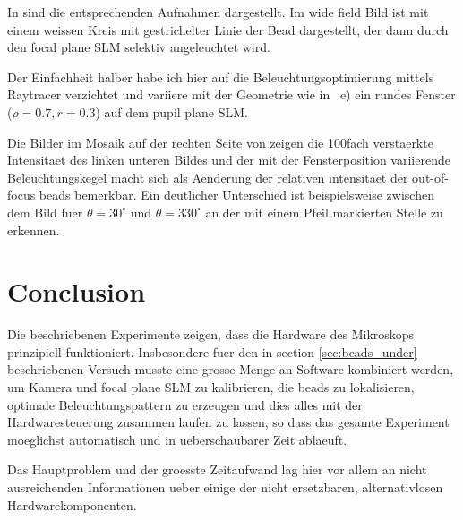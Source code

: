In  sind die entsprechenden Aufnahmen
dargestellt. Im wide field Bild ist mit einem weissen Kreis mit
gestrichelter Linie der Bead dargestellt, der dann durch den focal
plane SLM selektiv angeleuchtet wird. 

Der Einfachheit halber habe ich hier auf die Beleuchtungsoptimierung
mittels Raytracer verzichtet und variiere mit der Geometrie wie in
~e) ein rundes Fenster ($\rho=0.7, r=0.3$)
auf dem pupil plane SLM.

Die Bilder im Mosaik auf der rechten Seite von \label{fig:montage-ang}
zeigen die 100fach verstaerkte Intensitaet des linken unteren Bildes
und der mit der Fensterposition variierende Beleuchtungskegel macht
sich als Aenderung der relativen intensitaet der out-of-focus beads
bemerkbar. Ein deutlicher Unterschied ist beispielsweise zwischen dem
Bild fuer $\theta=30^\circ$ und $\theta=330^\circ$ an der mit einem
Pfeil markierten Stelle zu erkennen.

\section{Conclusion}
Die beschriebenen Experimente zeigen, dass die Hardware des Mikroskops
prinzipiell funktioniert.  Insbesondere fuer den in section
\ref{sec:beads_under} beschriebenen Versuch musste eine grosse Menge
an Software kombiniert werden, um Kamera und focal plane SLM zu
kalibrieren, die beads zu lokalisieren, optimale Beleuchtungspattern
zu erzeugen und dies alles mit der Hardwaresteuerung zusammen laufen
zu lassen, so dass das gesamte Experiment moeglichst automatisch und
in ueberschaubarer Zeit ablaeuft.

Das Hauptproblem und der groesste Zeitaufwand lag hier vor allem an
nicht ausreichenden Informationen ueber einige der nicht ersetzbaren,
alternativlosen Hardwarekomponenten.

